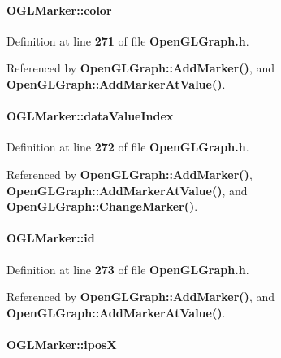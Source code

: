 \paragraph[{color}]{ O\+G\+L\+Marker\+::color}\label{structOGLMarker_a0f1cfbbf4e340a4511c1cb6e84a24a1b}


Definition at line {\bf 271} of file {\bf Open\+G\+L\+Graph.\+h}.



Referenced by {\bf Open\+G\+L\+Graph\+::\+Add\+Marker()}, and {\bf Open\+G\+L\+Graph\+::\+Add\+Marker\+At\+Value()}.

\paragraph[{data\+Value\+Index}]{ O\+G\+L\+Marker\+::data\+Value\+Index}\label{structOGLMarker_ab8b6b8e6ce2b294a5b38e2b96a0d0a00}


Definition at line {\bf 272} of file {\bf Open\+G\+L\+Graph.\+h}.



Referenced by {\bf Open\+G\+L\+Graph\+::\+Add\+Marker()}, {\bf Open\+G\+L\+Graph\+::\+Add\+Marker\+At\+Value()}, and {\bf Open\+G\+L\+Graph\+::\+Change\+Marker()}.

\paragraph[{id}]{ O\+G\+L\+Marker\+::id}\label{structOGLMarker_a449501c3299f00d0bcbe0fa808794afd}


Definition at line {\bf 273} of file {\bf Open\+G\+L\+Graph.\+h}.



Referenced by {\bf Open\+G\+L\+Graph\+::\+Add\+Marker()}, and {\bf Open\+G\+L\+Graph\+::\+Add\+Marker\+At\+Value()}.

\paragraph[{iposX}]{ O\+G\+L\+Marker\+::iposX}\label{structOGLMarker_a1dced33c4fd1c502b32de2a3e44dea6b}


